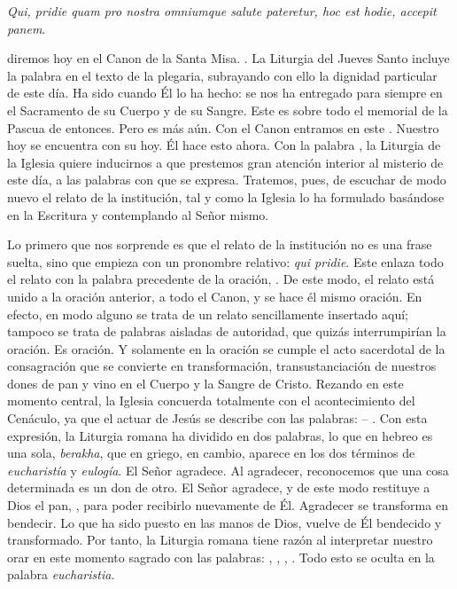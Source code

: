 \begin{body}
\textit{Qui, pridie quam pro nostra omniumque salute pateretur, hoc est hodie, accepit panem}. 

 diremos hoy en el Canon de la Santa Misa. . La Liturgia del Jueves Santo incluye la palabra  en el texto de la plegaria, subrayando con ello la dignidad particular de este día. Ha sido  cuando Él lo ha hecho: se nos ha entregado para siempre en el Sacramento de su Cuerpo y de su Sangre. Este  es sobre todo el memorial de la Pascua de entonces. Pero es más aún. Con el Canon entramos en este . Nuestro hoy se encuentra con su hoy. Él hace esto ahora. Con la palabra , la Liturgia de la Iglesia quiere inducirnos a que prestemos gran atención interior al misterio de este día, a las palabras con que se expresa. Tratemos, pues, de escuchar de modo nuevo el relato de la institución, tal y como la Iglesia lo ha formulado basándose en la Escritura y contemplando al Señor mismo.

Lo primero que nos sorprende es que el relato de la institución no es una frase suelta, sino que empieza con un pronombre relativo: \textit{qui pridie}. Este  enlaza todo el relato con la palabra precedente de la oración, . De este modo, el relato está unido a la oración anterior, a todo el Canon, y se hace él mismo oración. En efecto, en modo alguno se trata de un relato sencillamente insertado aquí; tampoco se trata de palabras aisladas de autoridad, que quizás interrumpirían la oración. Es oración. Y solamente en la oración se cumple el acto sacerdotal de la consagración que se convierte en transformación, transustanciación de nuestros dones de pan y vino en el Cuerpo y la Sangre de Cristo. Rezando en este momento central, la Iglesia concuerda totalmente con el acontecimiento del Cenáculo, ya que el actuar de Jesús se describe con las palabras: – . Con esta expresión, la Liturgia romana ha dividido en dos palabras, lo que en hebreo es una sola, \textit{berakha}, que en griego, en cambio, aparece en los dos términos de \textit{eucharistía} y \textit{eulogía}. El Señor agradece. Al agradecer, reconocemos que una cosa determinada es un don de otro. El Señor agradece, y de este modo restituye a Dios el pan, , para poder recibirlo nuevamente de Él. Agradecer se transforma en bendecir. Lo que ha sido puesto en las manos de Dios, vuelve de Él bendecido y transformado. Por tanto, la Liturgia romana tiene razón al interpretar nuestro orar en este momento sagrado con las palabras: , , , . Todo esto se oculta en la palabra \textit{eucharistia.}


\end{body}
